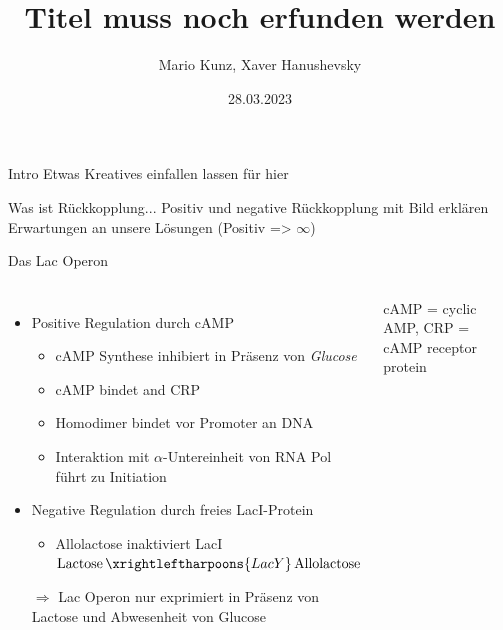 \documentclass[11pt,aspectratio=169,reqno]{beamer}
\title{Titel muss noch erfunden werden}
\date[28.03.2023]{28.03.2023}
\author{Mario Kunz, Xaver Hanushevsky}
\institute{D-BIOL}
\begin{document}
\titleframe

\begin{frame}[fragile]{Intro}
    Etwas Kreatives einfallen lassen für hier
\end{frame}

\begin{frame}{Was ist Rückkopplung...}
Positiv und negative Rückkopplung mit Bild erklären
Erwartungen an unsere Lösungen (Positiv => $\infty$)
\end{frame}

\begin{frame}{Das Lac Operon}
\begin{columns}

    \begin{itemize}
        \item Positive Regulation durch cAMP\\
        \begin{itemize}
            \item cAMP Synthese inhibiert in Präsenz von \emph{Glucose}
            \item cAMP bindet and CRP
            \item Homodimer bindet vor Promoter an DNA
            \item Interaktion mit $\alpha$-Untereinheit von RNA Pol führt zu Initiation
        \end{itemize}
        \item Negative Regulation durch freies LacI-Protein
        \begin{itemize}
            \item Allolactose inaktiviert LacI \\ $\ce{Lactose $\xrightleftharpoons{LacY}$ Allolactose}$
        \end{itemize}
        \item[$\Rightarrow$] Lac Operon nur exprimiert in Präsenz von Lactose und Abwesenheit von Glucose
    \end{itemize}

    {\tiny cAMP = cyclic AMP, CRP = cAMP receptor protein}
    

\end{columns}
\end{frame}
\end{document}
